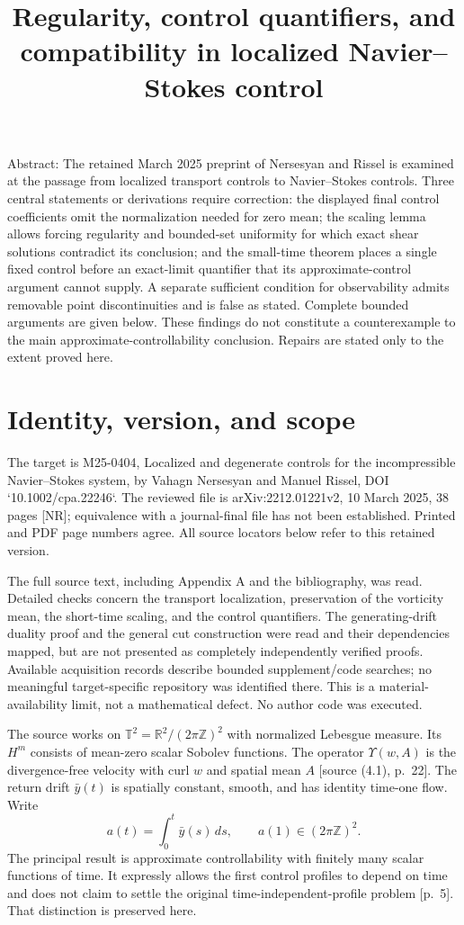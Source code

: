 \documentclass[10pt]{article}
\title{Regularity, control quantifiers, and compatibility
in localized Navier–Stokes control}
\author{}
\date{}
\begin{document}
\maketitle
Abstract: The retained March 2025 preprint of Nersesyan and Rissel is examined at the passage from localized transport controls to Navier–Stokes controls. Three central statements or derivations require correction: the displayed final control coefficients omit the normalization needed for zero mean; the scaling lemma allows forcing regularity and bounded-set uniformity for which exact shear solutions contradict its conclusion; and the small-time theorem places a single fixed control before an exact-limit quantifier that its approximate-control argument cannot supply. A separate sufficient condition for observability admits removable point discontinuities and is false as stated. Complete bounded arguments are given below. These findings do not constitute a counterexample to the main approximate-controllability conclusion. Repairs are stated only to the extent proved here.\par
\section*{Identity, version, and scope}
The target is M25-0404, Localized and degenerate controls for the incompressible Navier–Stokes system, by Vahagn Nersesyan and Manuel Rissel, DOI `10.1002/cpa.22246`. The reviewed file is arXiv:2212.01221v2, 10 March 2025, 38 pages [NR]; equivalence with a journal-final file has not been established. Printed and PDF page numbers agree. All source locators below refer to this retained version.\par
The full source text, including Appendix A and the bibliography, was read. Detailed checks concern the transport localization, preservation of the vorticity mean, the short-time scaling, and the control quantifiers. The generating-drift duality proof and the general cut construction were read and their dependencies mapped, but are not presented as completely independently verified proofs. Available acquisition records describe bounded supplement/code searches; no meaningful target-specific repository was identified there. This is a material-availability limit, not a mathematical defect. No author code was executed.\par
The source works on \(\mathbb T^2=\mathbb R^2/(2\pi\mathbb Z)^2\) with normalized Lebesgue measure. Its \(H^m\) consists of mean-zero scalar Sobolev functions. The operator \(\Upsilon(w,A)\) is the divergence-free velocity with curl \(w\) and spatial mean \(A\) [source (4.1), p. 22]. The return drift \(\bar y(t)\) is spatially constant, smooth, and has identity time-one flow. Write \[a(t)=\int_0^t\bar y(s)\,ds,\qquad a(1)\in(2\pi\mathbb Z)^2.\] The principal result is approximate controllability with finitely many scalar functions of time. It expressly allows the first control profiles to depend on time and does not claim to settle the original time-independent-profile problem [p. 5]. That distinction is preserved here.\par
\end{document}
